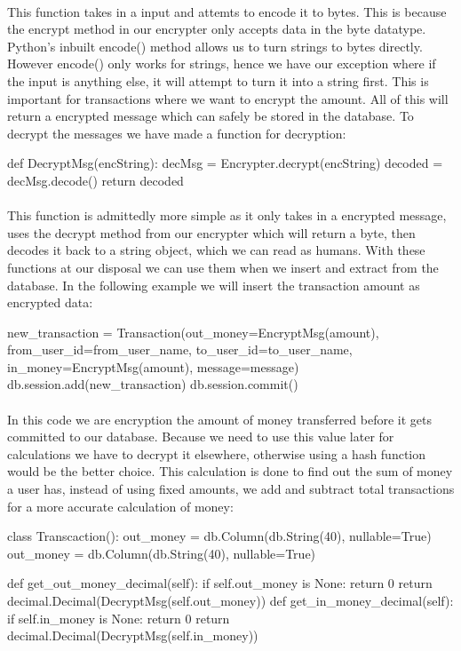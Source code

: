 \paragraph{}
This function takes in a input and attemts to encode it to bytes. This is because the encrypt method in our encrypter only accepts data in the byte datatype. Python's inbuilt encode() method allows us to turn strings to bytes directly. However encode() only works for strings, hence we have our exception where if the input is anything else, it will attempt to turn it into a string first. This is important for transactions where we want to encrypt the amount. All of this will return a encrypted message which can safely be stored in the database. To decrypt the messages we have made a function for decryption:
\begin{python}
def DecryptMsg(encString):
decMsg = Encrypter.decrypt(encString)
decoded = decMsg.decode()
return decoded
\end{python}
\paragraph{}
This function is admittedly more simple as it only takes in a encrypted message, uses the decrypt method from our encrypter which will return a byte, then decodes it back to a string object, which we can read as humans. With these functions at our disposal we can use them when we insert and extract from the database. In the following example we will insert the transaction amount as encrypted data:
\begin{python}
new_transaction = Transaction(out_money=EncryptMsg(amount), 
                from_user_id=from_user_name, to_user_id=to_user_name,
                in_money=EncryptMsg(amount), message=message)
    db.session.add(new_transaction)
    db.session.commit()
\end{python}
\paragraph{}
In this code we are encryption the amount of money transferred before it gets committed to our database. Because we need to use this value later for calculations we have to decrypt it elsewhere, otherwise using a hash function would be the better choice. This calculation is done to find out the sum of money a user has, instead of using fixed amounts, we add and subtract total transactions for a more accurate calculation of money:

\begin{python}
class Transcaction():
out_money = db.Column(db.String(40), nullable=True)
out_money = db.Column(db.String(40), nullable=True)

def get_out_money_decimal(self):
    if self.out_money is None:
        return 0
    return decimal.Decimal(DecryptMsg(self.out_money))
def get_in_money_decimal(self):
    if self.in_money is None:
        return 0
    return decimal.Decimal(DecryptMsg(self.in_money)) 
\end{python}
